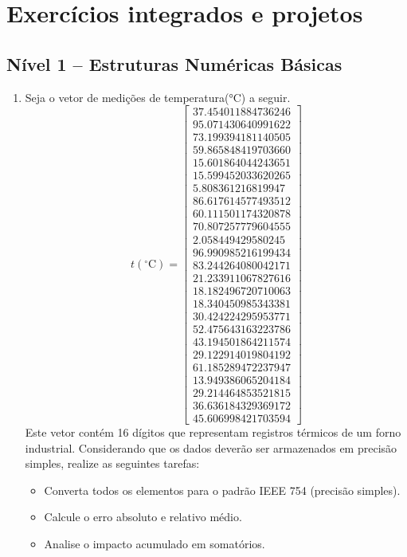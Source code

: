 \section{Exercícios integrados e projetos} \label{sec:ExercicioIntetradosProjetos}


\subsection*{Nível 1 -- Estruturas Numéricas Básicas}

\begin{enumerate}[label=\thesection.\arabic*]

\item Seja o vetor de medições de temperatura(°C) a seguir.
\[
t(^{\circ}\mathrm{C}) = \begin{bmatrix}
	37.454011884736246 \\
	95.071430640991622 \\
	73.199394181140505 \\
	59.865848419703660 \\
	15.601864044243651 \\
	15.599452033620265 \\
	5.808361216819947 \\
	86.617614577493512 \\
	60.111501174320878 \\
	70.807257779604555 \\
	2.058449429580245 \\
	96.990985216199434 \\
	83.244264080042171 \\
	21.233911067827616 \\
	18.182496720710063 \\
	18.340450985343381 \\
	30.424224295953771 \\
	52.475643163223786 \\
	43.194501864211574 \\
	29.122914019804192 \\
	61.185289472237947 \\
	13.949386065204184 \\
	29.214464853521815 \\
	36.636184329369172 \\
	45.606998421703594
\end{bmatrix}
\]
Este vetor contém 16 dígitos que representam registros térmicos de um forno industrial. 
Considerando que os dados deverão ser armazenados em precisão simples, realize as seguintes tarefas:
	\begin{itemize}
	\item Converta todos os elementos para o padrão IEEE 754 (precisão simples).
	\item Calcule o erro absoluto e relativo médio.
	\item Analise o impacto acumulado em somatórios.
	\end{itemize}

	
\end{enumerate}
